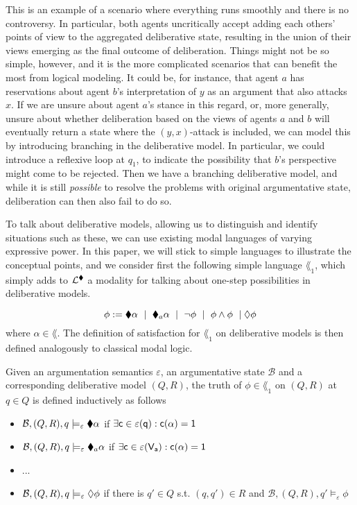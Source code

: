 \documentclass[greybox]{svmult}
\newcommand{\clab}{\sf c}
\newcommand{\views}{\mathcal B}
\newcommand{\sem}{\varepsilon}
\begin{document}
This is an example of a scenario where everything runs smoothly and there is no controversy. In particular, both agents uncritically accept adding each others' points of view to the aggregated deliberative state, resulting in the union of their views emerging as the final outcome of deliberation. Things might not be so simple, however, and it is the more complicated scenarios that can benefit the most from logical modeling. It could be, for instance, that agent $a$ has reservations about agent $b$'s interpretation of $y$ as an argument that also attacks $x$. If we are unsure about agent $a$'s stance in this regard, or, more generally, unsure about whether deliberation based on the views of agents $a$ and $b$ will eventually return a state where the $(y,x)$-attack is included, we can model this by introducing branching in the deliberative model. In particular, we could introduce a reflexive loop at $q_1$, to indicate the possibility that $b$'s perspective might come to be rejected. Then we have a branching deliberative model, and while it is still \emph{possible} to resolve the problems with original argumentative state, deliberation can then also fail to do so. 

To talk about deliberative models, allowing us to distinguish and identify situations such as these, we can use existing modal languages of varying expressive power. In this paper, we will stick to simple languages to illustrate the conceptual points, and we consider first the following simple language $\lang_1$, which simply adds to $\mathcal L^{\blacklozenge}$ a modality for talking about one-step possibilities in deliberative models.

$$
\phi := \blacklozenge \alpha \ \mid \ \blacklozenge_a \alpha \ \mid \ \neg \phi \ \mid \ \phi \land \phi \ \mid \lozenge \phi
$$
where $\alpha \in \lang$. The definition of satisfaction for $\lang_1$ on deliberative models is then defined analogously to classical modal logic.

\begin{definition}\label{truth1}
Given an argumentation semantics $\sem$, an argumentative state $\views$ and a corresponding deliberative model $(Q,R)$, the truth of $\phi \in \lang_1$ on $(Q,R)$ at $q \in Q$ is defined inductively as follows
\begin{itemize}
\item $\views, (Q,R),q\models_\sem \cdia \alpha$ if $\exists \clab \in \sem(q): \overline \clab(\alpha) = 1$
\item $\views,(Q,R),q\models_\sem \cdia_a \alpha$ if $\exists \clab \in \sem(V_a): \overline \clab(\alpha) = 1$
\item ...
\item $\views,(Q,R),q \models_\sem \adia \phi$ if there is $q' \in Q$ s.t. $(q,q') \in R$ and $\views,(Q,R),q' \models_\sem \phi$
\end{itemize}
\end{definition}
 
\end{document}
